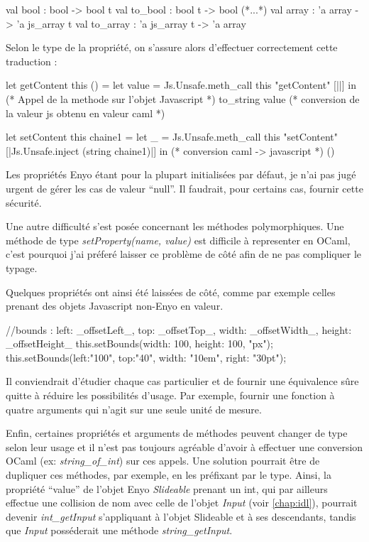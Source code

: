 \begin{OCaml}
  val bool : bool -> bool t
  val to_bool : bool t -> bool
  (*...*)
  val array : 'a array -> 'a js_array t
  val to_array : 'a js_array t -> 'a array
\end{OCaml}

Selon le type de la propriété, on s'assure alors d'effectuer correctement cette traduction :

\begin{OCaml}
  let getContent this () =
    let value = Js.Unsafe.meth_call 
                     this 
                     "getContent" 
                     [||] in (* Appel de la methode sur l'objet Javascript *)
    to_string value (* conversion de la valeur js obtenu en valeur caml *)
\end{OCaml}
\clearpage %
\begin{OCaml}
  let setContent this chaine1 =
    let _ = Js.Unsafe.meth_call 
                this 
                "setContent" 
                [|Js.Unsafe.inject (string chaine1)|] in (* conversion caml -> javascript *)
    ()
\end{OCaml}

Les propriétés Enyo étant pour la plupart initialisées par défaut, je n'ai pas jugé urgent
de gérer les cas de valeur ``null''. Il faudrait, pour certains cas, fournir cette sécurité.\medskip

Une autre difficulté s'est posée concernant les méthodes polymorphiques. Une méthode de type
\emph{setProperty(name, value)} est difficile à representer en OCaml, c'est pourquoi j'ai préferé
laisser ce problème de côté afin de ne pas compliquer le typage.

Quelques propriétés ont ainsi été laissées de côté, comme par exemple celles prenant des
objets Javascript non-Enyo en valeur.

\begin{JavaScript}
//bounds : {left: _offsetLeft_, top: _offsetTop_, width: _offsetWidth_, height: _offsetHeight_}
this.setBounds({width: 100, height: 100}, "px");
this.setBounds({left:"100", top:"40", width: "10em", right: "30pt"});
\end{JavaScript}

Il conviendrait d'étudier chaque cas particulier et de fournir une équivalence sûre quitte à
réduire les possibilités d'usage. Par exemple, fournir une fonction à quatre arguments qui
n'agit sur une seule unité de mesure.\medskip

Enfin, certaines propriétés et arguments de méthodes peuvent changer de type selon leur usage 
et il n'est pas toujours agréable d'avoir à effectuer une conversion OCaml (ex: \emph{string\_of\_int})
sur ces appels. Une solution pourrait être de dupliquer ces méthodes, par exemple, en les préfixant 
par le type. Ainsi, la propriété ``value''  de l'objet Enyo \emph{Slideable} prenant un int, qui par ailleurs 
effectue une collision de nom avec celle de l'objet \emph{Input} (voir \ref{chap:idl}), pourrait 
devenir \emph{int\_getInput} s'appliquant à l'objet Slideable et à ses descendants, tandis que \emph{Input}
posséderait une méthode \emph{string\_getInput}.

